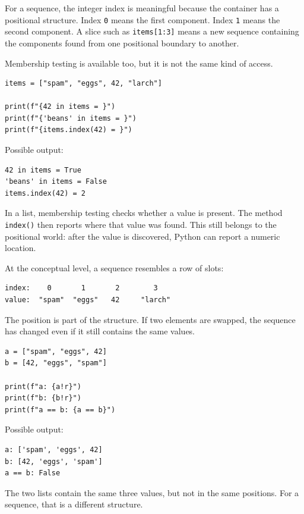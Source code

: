 For a sequence, the integer index is meaningful because the container has a positional structure. Index \texttt{0} means the first component. Index \texttt{1} means the second component. A slice such as \texttt{items[1:3]} means a new sequence containing the components found from one positional boundary to another.

Membership testing is available too, but it is not the same kind of access.

\begin{verbatim}
items = ["spam", "eggs", 42, "larch"]

print(f"{42 in items = }")
print(f"{'beans' in items = }")
print(f"{items.index(42) = }")
\end{verbatim}

Possible output:

\begin{verbatim}
42 in items = True
'beans' in items = False
items.index(42) = 2
\end{verbatim}

In a list, membership testing checks whether a value is present. The method \texttt{index()} then reports where that value was found. This still belongs to the positional world: after the value is discovered, Python can report a numeric location.

At the conceptual level, a sequence resembles a row of slots:

\begin{verbatim}
index:    0       1       2        3
value:  "spam"  "eggs"   42     "larch"
\end{verbatim}

The position is part of the structure. If two elements are swapped, the sequence has changed even if it still contains the same values.

\begin{verbatim}
a = ["spam", "eggs", 42]
b = [42, "eggs", "spam"]

print(f"a: {a!r}")
print(f"b: {b!r}")
print(f"a == b: {a == b}")
\end{verbatim}

Possible output:

\begin{verbatim}
a: ['spam', 'eggs', 42]
b: [42, 'eggs', 'spam']
a == b: False
\end{verbatim}

The two lists contain the same three values, but not in the same positions. For a sequence, that is a different structure.

